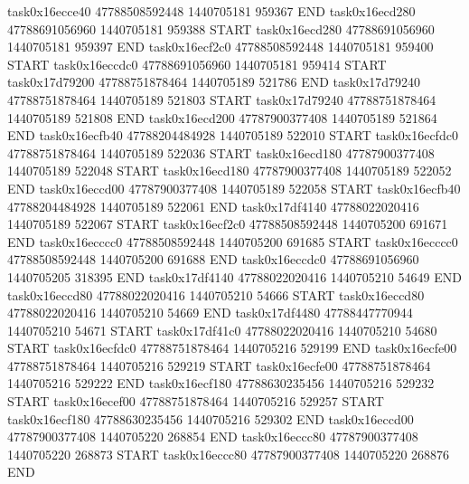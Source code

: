 task0x16ecce40 47788508592448          1440705181               959367  END
task0x16ecd280 47788691056960          1440705181               959388  START
task0x16ecd280 47788691056960          1440705181               959397  END
task0x16ecf2c0 47788508592448          1440705181               959400  START
task0x16eccdc0 47788691056960          1440705181               959414  START
task0x17d79200 47788751878464          1440705189               521786  END
task0x17d79240 47788751878464          1440705189               521803  START
task0x17d79240 47788751878464          1440705189               521808  END
task0x16ecd200 47787900377408          1440705189               521864  END
task0x16ecfb40 47788204484928          1440705189               522010  START
task0x16ecfdc0 47788751878464          1440705189               522036  START
task0x16ecd180 47787900377408          1440705189               522048  START
task0x16ecd180 47787900377408          1440705189               522052  END
task0x16eccd00 47787900377408          1440705189               522058  START
task0x16ecfb40 47788204484928          1440705189               522061  END
task0x17df4140 47788022020416          1440705189               522067  START
task0x16ecf2c0 47788508592448          1440705200               691671  END
task0x16ecccc0 47788508592448          1440705200               691685  START
task0x16ecccc0 47788508592448          1440705200               691688  END
task0x16eccdc0 47788691056960          1440705205               318395  END
task0x17df4140 47788022020416          1440705210                54649  END
task0x16eccd80 47788022020416          1440705210                54666  START
task0x16eccd80 47788022020416          1440705210                54669  END
task0x17df4480 47788447770944          1440705210                54671  START
task0x17df41c0 47788022020416          1440705210                54680  START
task0x16ecfdc0 47788751878464          1440705216               529199  END
task0x16ecfe00 47788751878464          1440705216               529219  START
task0x16ecfe00 47788751878464          1440705216               529222  END
task0x16ecf180 47788630235456          1440705216               529232  START
task0x16ecef00 47788751878464          1440705216               529257  START
task0x16ecf180 47788630235456          1440705216               529302  END
task0x16eccd00 47787900377408          1440705220               268854  END
task0x16eccc80 47787900377408          1440705220               268873  START
task0x16eccc80 47787900377408          1440705220               268876  END
